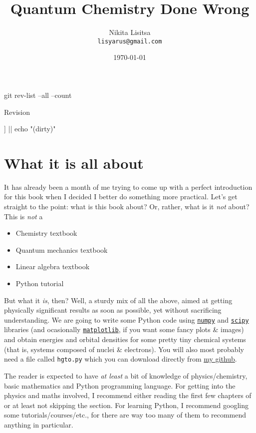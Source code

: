 \documentclass{article}
\newcommand{\githubrepo}{https://github.com/lisyarus/chembook}
\begin{document}
\title{Quantum Chemistry Done Wrong}
\author{Nikita Lisitsa \\ \texttt{lisyarus@gmail.com}}
\date{\today}

\maketitle

\bash
git rev-list --all --count
\END
\centerline{Revision \bashStdout}

\bash
[[ "$(git diff --stat)" == "" ]] || echo "(dirty)"
\END
\centerline{\bashStdout}

\newpage

\tableofcontents

\newpage

\section{What it is all about}

It has already been a month of me trying to come up with a perfect introduction for this book when I decided I better do something more practical. Let's get straight to the point: what is this book about? Or, rather, what is it \textit{not} about? This is \textit{not} a

\begin{itemize}
\item Chemistry textbook
\item Quantum mechanics textbook
\item Linear algebra textbook
\item Python tutorial
\end{itemize}

But what it \textit{is}, then? Well, a sturdy mix of all the above, aimed at getting physically significant results as soon as possible, yet without sacrificing understanding. We are going to write some Python code using \href{https://numpy.org}{\texttt{numpy}} and \href{https://www.scipy.org}{\texttt{scipy}} libraries (and ocasionally \href{https://matplotlib.org}{\texttt{matplotlib}}, if you want some fancy plots \& images) and obtain energies and orbital densities for some pretty tiny chemical systems (that is, systems composed of nuclei \& electrons). You will also most probably need a file called \texttt{hgto.py} which you can download directly from \href{\githubrepo/blob/master/code/hgto.py}{my github}.

The reader is expected to have \textit{at least} a bit of knowledge of physics/chemistry, basic mathematics and Python programming language. For getting into the physics and maths involved, I recommend either reading the first few chapters of \cite{ref:atkins} or at least not skipping the  section. For learning Python, I recommend googling some tutorials/courses/etc., for there are way too many of them to recommend anything in particular.
\end{document}
